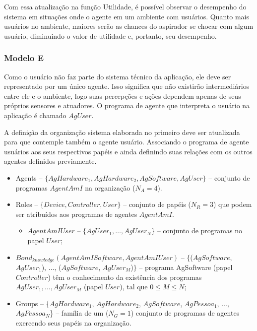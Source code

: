 Com essa atualização na função Utilidade, é possível observar o desempenho do sistema em situações onde o agente em um ambiente com usuários. Quanto mais usuários no ambiente, maiores serão as chances do aspirador se chocar com algum usuário, diminuindo o valor de utilidade e, portanto, seu desempenho. 

\subsubsection{Modelo E}

Como o usuário não faz parte do sistema técnico da aplicação, ele deve ser representado por um único agente. Isso significa que não existirão intermediários entre ele e o ambiente, logo suas percepções e ações dependem apenas de seus próprios sensores e atuadores. O programa de agente que interpreta o usuário na aplicação é chamado $AgUser$.

A definição da organização sistema elaborada no primeiro deve ser atualizada para que contemple também o agente usuário. Associando o programa de agente usuários aos seus respectivos papéis e ainda definindo suas relações com os outros agentes definidos previamente. 

\begin{itemize}
    \item Agents --	$\{AgHardware_1, AgHardware_2, AgSoftware, AgUser \}$ – conjunto de programas $AgentAmI$ na organização ($N_A = 4$).
    
    \item Roles	-- $\{Device, Controller, User\}$ – conjunto de papéis ($N_R = 3$) que podem ser atribuídos aos programas de agentes $AgentAmI$.
    
    \begin{itemize}
        \item $AgentAmIUser$ -- $\{AgUser_1, \ldots, AgUser_N\}$ – conjunto de programas no papel $User$;
    \end{itemize}
    
    \item $Bond_{knowledge}(AgentAmISoftware, AgentAmIUser)$ -- $\{$($AgSoftware$, $AgUser_1$), $\ldots$, ($AgSoftware$, $AgUser_M$)$\}$ – programa AgSoftware (papel $Controller$) têm o conhecimento da existência dos programas $AgUser_1, \ldots, AgUser_M$ (papel $User$), tal que $0 \leq M \leq N$;
    
    \item Groups -- \{$AgHardware_1$, $AgHardware_2$, $AgSoftware$, $AgPessoa_1$, $\ldots$, $AgPessoa_N$\} – família de um ($N_G = 1$) conjunto de programas de agentes exercendo seus papéis na organização.
\end{itemize}

